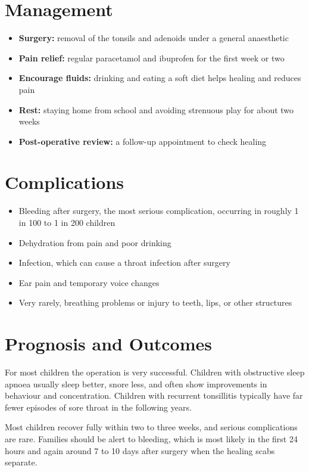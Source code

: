 \section*{Management}
\begin{itemize}
    \item \textbf{Surgery:} removal of the tonsils and adenoids under a general anaesthetic
    \item \textbf{Pain relief:} regular paracetamol and ibuprofen for the first week or two
    \item \textbf{Encourage fluids:} drinking and eating a soft diet helps healing and reduces pain
    \item \textbf{Rest:} staying home from school and avoiding strenuous play for about two weeks
    \item \textbf{Post-operative review:} a follow-up appointment to check healing
\end{itemize}

\section*{Complications}
\begin{itemize}
    \item Bleeding after surgery, the most serious complication, occurring in roughly 1 in 100 to 1 in 200 children
    \item Dehydration from pain and poor drinking
    \item Infection, which can cause a throat infection after surgery
    \item Ear pain and temporary voice changes
    \item Very rarely, breathing problems or injury to teeth, lips, or other structures
\end{itemize}

\section*{Prognosis and Outcomes}
For most children the operation is very successful. Children with obstructive sleep apnoea usually sleep better, snore less, and often show improvements in behaviour and concentration. Children with recurrent tonsillitis typically have far fewer episodes of sore throat in the following years.

Most children recover fully within two to three weeks, and serious complications are rare. Families should be alert to bleeding, which is most likely in the first 24 hours and again around 7 to 10 days after surgery when the healing scabs separate.

